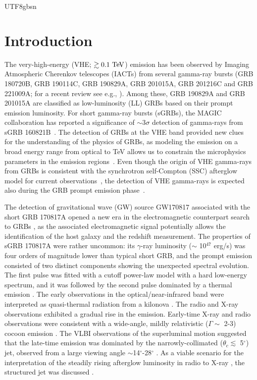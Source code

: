 \documentclass[fleqn,usenatbib]{mnras}
\begin{document}
\begin{CJK*}{UTF8}{gbsn}
\section{Introduction}
The very-high-energy (VHE; $\gtrsim 0.1\rm~TeV$) emission has been observed by Imaging Atmospheric Cherenkov telescopes (IACTs) from several gamma-ray bursts  
(GRB 180720B, GRB 190114C, GRB 190829A, GRB 201015A, GRB 201216C and GRB 221009A; for a recent review see e.g., \cite{Noda:2022hbo}).  
Among these, GRB 190829A and GRB 201015A are classified as low-luminosity (LL) GRBs based on their prompt emission luminosity.
For short gamma-ray bursts (sGRBs), the MAGIC collaboration has reported a significance of $\sim 3\sigma$ detection of gamma-rays from sGRB 160821B~\citep{MAGIC:2020ikk}. 
The detection of GRBs at the VHE band provided new clues for the understanding of the physics of GRBs, as modeling the emission on a broad energy range from optical to TeV allows us to constrain the microphysics parameters in the emission regions~\citep[e.g.,][]{derishevpiran2021,asano2020}. 
Even though the origin of VHE gamma-rays from GRBs is consistent with the synchrotron self-Compton (SSC) afterglow model for current observations~\citep[e.g.,][]{Meszaros:1994sd, Zhang:2001az, sari01}, the detection of VHE gamma-rays is expected also during the GRB prompt emission phase~\citep[e.g.,][]{inoue2013, vurm2017, bosnjak09, banerjee22, gillgranot22}.  

The detection of gravitational wave (GW) source GW170817 associated with the short GRB 170817A \citep{abbott2017a, abbott2017b} opened a new era in the electromagnetic counterpart search to GRBs \citep{lambkobayashi17, iokanakamura2018, nakar2020}, as the associated electromagnetic signal potentially allows the identification of the host galaxy and the redshift measurement. 
The properties of sGRB 170817A were rather uncommon: its $\gamma$-ray luminosity ($\sim$ 10$^{47}$ erg/s) was four orders of magnitude lower than typical short GRB, and the prompt emission consisted of two distinct components showing the unexpected spectral evolution. 
The first pulse was fitted with a cutoff power-law model with a hard low-energy spectrum, and it was followed by the second pulse dominated by a thermal emission \citep{pozanenko2018}. The early observations in the optical/near-infrared band were interpreted as quasi-thermal radiation from a kilonova \citep{tanaka17, kasen2017, utsumi2017, pian2017}. 
The radio and X-ray observations exhibited a gradual rise in the emission.
Early-time X-ray and radio observations were consistent with a wide-angle, mildly relativistic ($\Gamma\sim$ 2-3) cocoon emission \citep{kasliwal2017}. The VLBI observations of the superluminal motion suggested that the late-time emission was dominated by the narrowly-collimated ($\theta_c \lesssim$ 5$^\circ$) jet,  observed from a large viewing angle $\sim$14$^\circ$-28$^\circ$ \citep{mooleydeller18, ghirlanda19}.  As a viable scenario for the interpretation of the steadily rising afterglow luminosity in radio to X-ray \citep{margutti2018, mooley2018}, the structured jet was discussed \citep{Ioka:2019jlj, lazzati2018, urrutia2021, takahashi2021}.
 

\end{CJK*}
\end{document}
